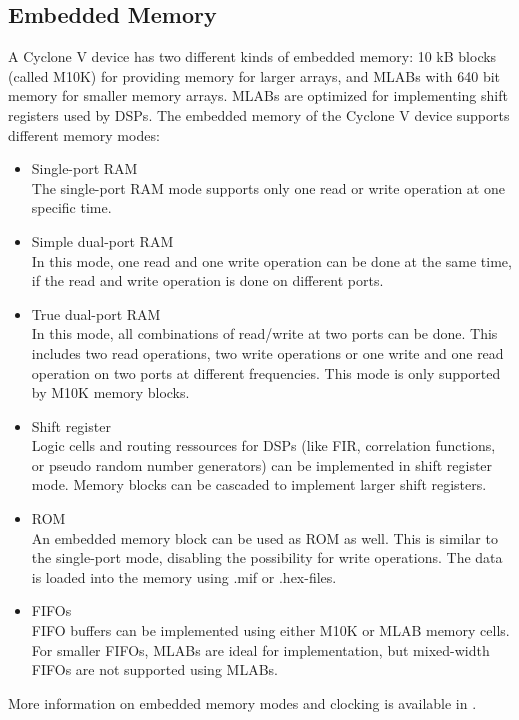 \subsection{Embedded Memory}
\label{chap:embmem}
A Cyclone V device has two different kinds of embedded memory: 10 kB blocks (called M10K) for providing memory for larger arrays, and MLABs with 640 bit memory for smaller memory arrays. MLABs are optimized for implementing shift registers used by DSPs. The embedded memory of the Cyclone V device supports different memory modes:
\begin{itemize}
\item Single-port RAM\\
The single-port RAM mode supports only one read or write operation at one specific time.
\item Simple dual-port RAM\\
In this mode, one read and one write operation can be done at the same time, if the read and write operation is done on different ports.
\item True dual-port RAM\\
In this mode, all combinations of read/write at two ports can be done. This includes two read operations, two write operations or one write and one read operation on two ports at different frequencies. This mode is only supported by M10K memory blocks.
\item Shift register\\
Logic cells and routing ressources for DSPs (like FIR, correlation functions, or pseudo random number generators) can be implemented in shift register mode. Memory blocks can be cascaded to implement larger shift registers.
\item ROM\\
An embedded memory block can be used as ROM as well. This is similar to the single-port mode, disabling the possibility for write operations. The data is loaded into the memory using .mif or .hex-files.
\item FIFOs\\
FIFO buffers can be implemented using either M10K or MLAB memory cells. For smaller FIFOs, MLABs are ideal for implementation, but mixed-width FIFOs are not supported using MLABs.
\end{itemize}
More information on embedded memory modes and clocking is available in \cite[chapter 2]{AlteraFPGA15}.
